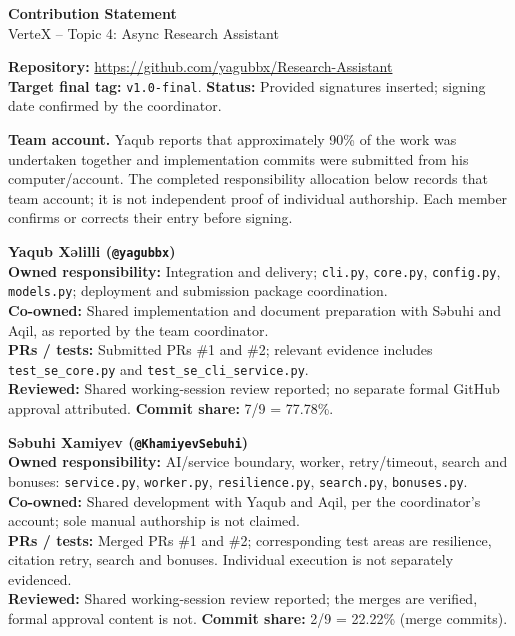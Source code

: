 \documentclass[10pt,a4paper]{article}
\begin{document}
\sloppy
\begin{center}{\Large\bfseries Contribution Statement}\\VerteX -- Topic 4: Async Research Assistant\end{center}
\textbf{Repository:} \url{https://github.com/yagubbx/Research-Assistant}\\
\textbf{Target final tag:} \texttt{v1.0-final}. \textbf{Status:} Provided signatures inserted; signing date confirmed by the coordinator.

\textbf{Team account.} Yaqub reports that approximately 90\% of the work was undertaken together and implementation commits were submitted from his computer/account. The completed responsibility allocation below records that team account; it is not independent proof of individual authorship. Each member confirms or corrects their entry before signing.

\textbf{Yaqub Xəlilli (\texttt{@yagubbx})}\\
\textbf{Owned responsibility:} Integration and delivery; \texttt{cli.py}, \texttt{core.py}, \texttt{config.py}, \texttt{models.py}; deployment and submission package coordination.\\
\textbf{Co-owned:} Shared implementation and document preparation with Səbuhi and Aqil, as reported by the team coordinator.\\
\textbf{PRs / tests:} Submitted PRs \#1 and \#2; relevant evidence includes \texttt{test\_se\_core.py} and \texttt{test\_se\_cli\_service.py}.\\
\textbf{Reviewed:} Shared working-session review reported; no separate formal GitHub approval attributed. \textbf{Commit share:} 7/9 = 77.78\%.

\textbf{Səbuhi Xamiyev (\texttt{@KhamiyevSebuhi})}\\
\textbf{Owned responsibility:} AI/service boundary, worker, retry/timeout, search and bonuses: \texttt{service.py}, \texttt{worker.py}, \texttt{resilience.py}, \texttt{search.py}, \texttt{bonuses.py}.\\
\textbf{Co-owned:} Shared development with Yaqub and Aqil, per the coordinator's account; sole manual authorship is not claimed.\\
\textbf{PRs / tests:} Merged PRs \#1 and \#2; corresponding test areas are resilience, citation retry, search and bonuses. Individual execution is not separately evidenced.\\
\textbf{Reviewed:} Shared working-session review reported; the merges are verified, formal approval content is not. \textbf{Commit share:} 2/9 = 22.22\% (merge commits).
\end{document}
